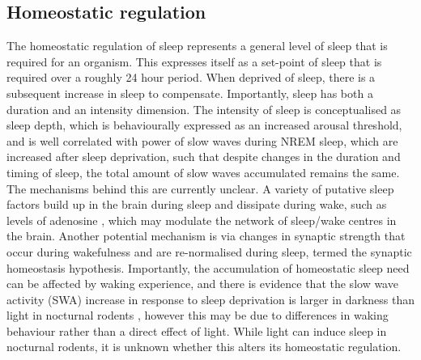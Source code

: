 \subsection{Homeostatic regulation}
The homeostatic regulation of sleep represents a general
level of sleep that is required for an organism. 
This expresses itself as a set-point of sleep
that is required over a roughly 24 hour period. 
When deprived of sleep, there is a subsequent increase 
in sleep to compensate\cite{porkka-heiskanen_sleep_2013}.
Importantly, sleep has both a duration and an intensity 
dimension\cite{deboer_sleep_2018}.
The intensity of sleep is conceptualised as 
sleep depth, which is behaviourally expressed 
as an increased arousal threshold, and 
is well correlated with power of 
slow waves during NREM sleep\cite{deboer_behavioral_2015}, 
which are increased after sleep deprivation, such that 
despite changes in the duration and timing of sleep, 
the total amount of slow waves accumulated remains 
the same\cite{deboer_sleep_2018, northeast_sleep_2019}.
The mechanisms behind this are currently unclear. 
A variety of putative sleep factors
build up in the brain during sleep and dissipate during wake, 
such as levels of adenosine
\cite{porkka-heiskanen_sleep_2013, schwartz_neurobiology_2015},
which may modulate the network of sleep/wake centres in the brain.
Another potential mechanism is via changes in synaptic strength
that occur during wakefulness and are re-normalised during sleep, 
termed the synaptic homeostasis 
hypothesis\cite{tononi_sleep_2003, vyazovskiy_sleep_2015}.
Importantly, the accumulation of homeostatic sleep need can be affected
by waking experience\cite{fisher_stereotypic_2016},
and there is evidence that 
the slow wave activity (SWA)
increase in response to sleep deprivation is larger 
in darkness than light in nocturnal rodents
\cite{huber_exploratory_2007, vyazovskiy_sleep_2007}, however
this may be due to differences in waking behaviour rather than a direct
effect of light\cite{huber_exploratory_2007}. 
While light can induce sleep in nocturnal rodents\cite{lupi_acute_2008},
it is unknown whether this alters its homeostatic regulation.


